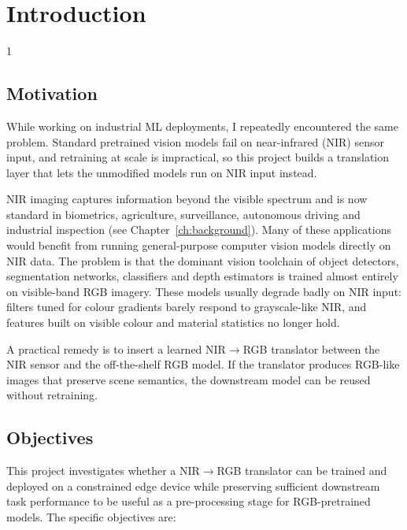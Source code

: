 \doublespacing %

\chapter{Introduction}
\label{ch:introduction}

\begin{spacing}{1} %
\minitoc %
\end{spacing} %
\thesisspacing %

\section{Motivation}
\label{sec:intro_motivation}

While working on industrial ML deployments, I repeatedly encountered the same problem. Standard pretrained vision models fail on near-infrared (NIR) sensor input, and retraining at scale is impractical, so this project builds a translation layer that lets the unmodified models run on NIR input instead.

NIR imaging captures information beyond the visible spectrum and is now standard in biometrics, agriculture, surveillance, autonomous driving and industrial inspection (see Chapter~\ref{ch:background}). Many of these applications would benefit from running general-purpose computer vision models directly on NIR data. The problem is that the dominant vision toolchain of object detectors, segmentation networks, classifiers and depth estimators is trained almost entirely on visible-band RGB imagery. These models usually degrade badly on NIR input: filters tuned for colour gradients barely respond to grayscale-like NIR, and features built on visible colour and material statistics no longer hold.

A practical remedy is to insert a learned NIR$\rightarrow$RGB translator between the NIR sensor and the off-the-shelf RGB model. If the translator produces RGB-like images that preserve scene semantics, the downstream model can be reused without retraining. 

\section{Objectives}
\label{sec:intro_objectives}

This project investigates whether a NIR$\rightarrow$RGB translator can be trained and deployed on a constrained edge device while preserving sufficient downstream task performance to be useful as a pre-processing stage for RGB-pretrained models. The specific objectives are:

